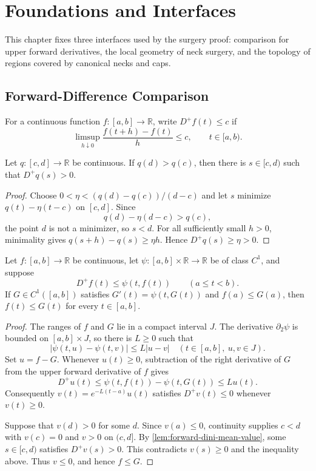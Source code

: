 \chapter{Foundations and Interfaces}

This chapter fixes three interfaces used by the surgery proof: comparison for
upper forward derivatives, the local geometry of neck surgery, and the
topology of regions covered by canonical necks and caps.

\section{Forward-Difference Comparison}

For a continuous function $f\colon[a,b]\to\mathbb R$, write
$D^+f(t)\le c$ if
\[
  \limsup_{h\downarrow0}\frac{f(t+h)-f(t)}h\le c,
  \qquad t\in[a,b).
\]

\begin{lemma}
\label{lem:forward-dini-mean-value}
\notready
Let $q\colon[c,d]\to\mathbb R$ be continuous.  If $q(d)>q(c)$, then
there is $s\in[c,d)$ such that $D^+q(s)>0$.
\end{lemma}

\begin{proof}
Choose $0<\eta<(q(d)-q(c))/(d-c)$ and let $s$ minimize
$q(t)-\eta(t-c)$ on $[c,d]$.  Since
\[
 q(d)-\eta(d-c)>q(c),
\]
the point $d$ is not a minimizer, so $s<d$.  For all sufficiently small
$h>0$, minimality gives $q(s+h)-q(s)\ge\eta h$.  Hence
$D^+q(s)\ge\eta>0$.
\end{proof}

\begin{theorem}
\label{thm:forward-dini-comparison}
\notready
Let $f\colon[a,b]\to\mathbb R$ be continuous, let
$\psi\colon[a,b]\times\mathbb R\to\mathbb R$ be of class $C^1$, and
suppose
\[
  D^+f(t)\le \psi(t,f(t))\qquad(a\le t<b).
\]
If $G\in C^1([a,b])$ satisfies $G'(t)=\psi(t,G(t))$ and
$f(a)\le G(a)$, then $f(t)\le G(t)$ for every $t\in[a,b]$.
\end{theorem}

\begin{proof}
The ranges of $f$ and $G$ lie in a compact interval $J$.  The derivative
$\partial_2\psi$ is bounded on $[a,b]\times J$, so there is $L\ge0$ such
that
\[
 |\psi(t,u)-\psi(t,v)|\le L|u-v|
 \quad(t\in[a,b],\ u,v\in J).
\]
Set $u=f-G$.  Whenever $u(t)\ge0$, subtraction of the right derivative of
$G$ from the upper forward derivative of $f$ gives
\[
 D^+u(t)\le \psi(t,f(t))-\psi(t,G(t))\le Lu(t).
\]
Consequently $v(t)=e^{-L(t-a)}u(t)$ satisfies $D^+v(t)\le0$ whenever
$v(t)\ge0$.

Suppose that $v(d)>0$ for some $d$.  Since $v(a)\le0$, continuity supplies
$c<d$ with $v(c)=0$ and $v>0$ on $(c,d]$.  By
\ref{lem:forward-dini-mean-value}, some $s\in[c,d)$ satisfies
$D^+v(s)>0$.  This contradicts $v(s)\ge0$ and the inequality above.
Thus $v\le0$, and hence $f\le G$.
\end{proof}

